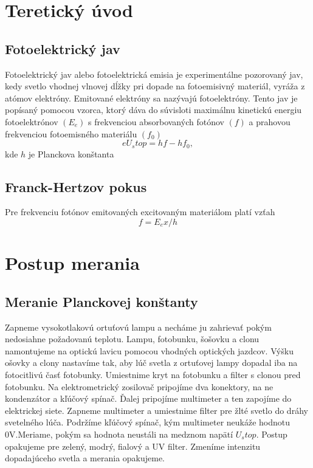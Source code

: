 \documentclass{article}
\begin{document}
\section{Teretický úvod}
\subsection{Fotoelektrický jav}
Fotoelektrický jav alebo fotoelektrická emisia  je experimentálne pozorovaný jav, kedy svetlo vhodnej vlnovej dĺžky pri dopade na fotoemisivný materiál, vyráža z atómov elektróny. Emitované elektróny sa nazývajú fotoelektróny. Tento jav je popísaný pomocou vzorca, ktorý dáva do súvisloti maximálnu kinetickú energiu fotoelektrónov $(E_e)$ s frekvenciou absorbovaných fotónov $(f)$ a prahovou frekvenciou fotoemisného materiálu $(f_0)$
\begin{equation}
eU_stop=hf-hf_0,
\end{equation} kde $h$ je Planckova konštanta 

\subsection{Franck-Hertzov pokus}
Pre frekvenciu fotónov emitovaných excitovaným materiálom platí vzťah 
\begin{equation}
f=E_ex/h
\end{equation}

\section{Postup merania}
\subsection{Meranie Planckovej konštanty}
Zapneme vysokotlakovú ortuťovú lampu a necháme ju zahrievať pokým nedosiahne požadovanú teplotu. Lampu, fotobunku, šošovku a clonu namontujeme na optickú lavicu pomocou vhodných optických jazdcov. Výšku ošovky a clony nastavíme tak, aby lúč svetla z ortuťovej lampy dopadal iba na fotocitlivú časť fotobunky. Umiestnime kryt na fotobunku a filter s clonou pred fotobunku. Na elektrometrický zosilovač pripojíme dva konektory, na ne kondenzátor a kľúčový spínač. Ďalej pripojíme multimeter a ten zapojíme do elektrickej siete. Zapneme multimeter a umiestnime filter pre žlté svetlo do dráhy svetelného lúča. Podržíme kľúčový spínač, kým multimeter neukáže hodnotu 0V.Meriame, pokým sa hodnota neustáli na medznom napätí $U_stop$. Postup opakujeme pre zelený, modrý, fialový a UV filter. Zmeníme intenzitu dopadajúceho svetla a merania opakujeme. 
\end{document}

